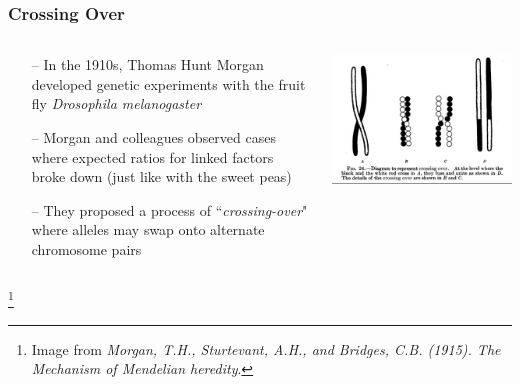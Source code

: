 \documentclass{beamer}
\newcommand\blfootnote[1]{%
	\begingroup
	\renewcommand\thefootnote{}\footnote{#1}%
	\addtocounter{footnote}{-1}%
	\endgroup
}
\begin{document}
\begin{frame}
	\frametitle{Crossing Over}
\begin{columns}
	
	\begin{column}{0.45\textwidth}
\begin{itemize}
\small 
	\item [--]  In the 1910s, Thomas Hunt Morgan developed genetic experiments with the fruit fly 	\textit{Drosophila melanogaster}
		\item [--] Morgan and colleagues observed cases where expected ratios for linked factors broke down (just like with the sweet peas)
			\item [--] They proposed a process of ``\textit{crossing-over}" where alleles may swap onto alternate chromosome pairs
	
\end{itemize}	
		\end{column}
	\begin{column}{0.6\textwidth}
				\includegraphics[keepaspectratio, width  =\textwidth]{img/MorganCrossover} 

	\end{column}
\end{columns}
	\blfootnote{Image from \textit{Morgan, T.H., Sturtevant, A.H., and Bridges, C.B. (1915). The Mechanism of Mendelian heredity}.}
\end{frame}
\end{document}
